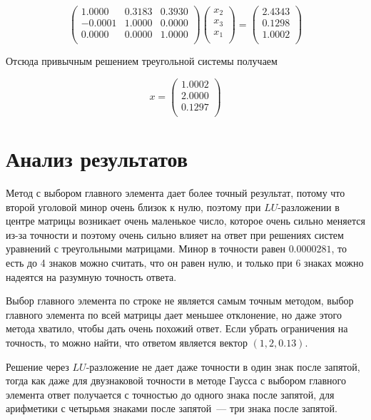\documentclass[11pt,a4paper,oneside]{article}
\begin{document}
$$ \left(\begin{matrix}         1.0000 & 0.3183 & 0.3930 \\     -0.0001 & 1.0000 & 0.0000 \\    0.0000 & 0.0000 & 1.0000 \\ \end{matrix}\right) \left(\begin{matrix}    x_2 \\  x_3 \\  x_1 \\ \end{matrix}\right) = \left(\begin{matrix}    2.4343 \\       0.1298 \\       1.0002 \\ \end{matrix}\right) $$

Отсюда привычным решением треугольной системы получаем

$$ x = \left(\begin{matrix}
	1.0002 \\
	2.0000 \\
	0.1297 \\
\end{matrix}\right) $$

\section{Анализ результатов}

Метод с выбором главного элемента дает более точный результат, потому что второй уголовой минор очень близок к нулю, поэтому при $LU$-разложении в центре матрицы возникает очень маленькое число, которое очень сильно меняется из-за точности и поэтому очень сильно влияет на ответ при решениях систем уравнений с треугольными матрицами. Минор в точности равен $0.0000281$, то есть до 4 знаков можно считать, что он равен нулю, и только при 6 знаках можно надеятся на разумную точность ответа.

Выбор главного элемента по строке не является самым точным методом, выбор главного элемента по всей матрицы дает меньшее отклонение, но даже этого метода хватило, чтобы дать очень похожий ответ. Если убрать ограничения на точность, то можно найти, что ответом является вектор $(1, 2, 0.13)$.

Решение через $LU$-разложение не дает даже точности в один знак после запятой, тогда как даже для двузнаковой точности в методе Гаусса с выбором главного элемента ответ получается с точностью до одного знака после запятой, для арифметики с четырьмя знаками после запятой~--- три знака после запятой.
\end{document}
